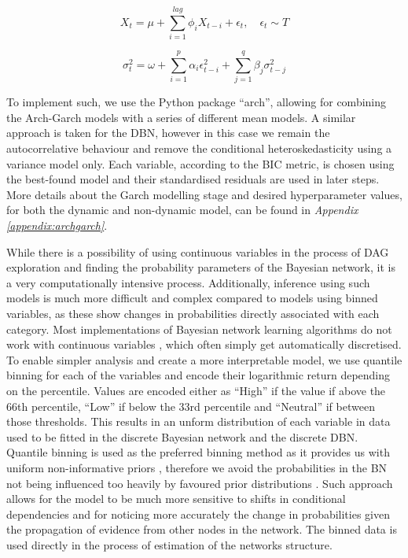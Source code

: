 \documentclass[12pt, letterpaper]{article}
\begin{document}
\begin{equation}
X_t = \mu + \sum_{i=1}^{lag} \phi_i X_{t-i} + \epsilon_t, \quad \epsilon_t \sim T
\end{equation}

\begin{equation}
\sigma_t^2=\omega+\sum_{i=1}^{p}{\alpha_i\epsilon_{t-i}^2}+\sum_{j=1}^{q}{\beta_j\sigma_{t-j}^2}
\end{equation}

To implement such, we use the Python package “arch”, allowing for combining the Arch-Garch models with a series of different mean models. A similar approach is taken for the DBN, however in this case we remain the autocorrelative behaviour and remove the conditional heteroskedasticity using a variance model only. Each variable, according to the BIC metric, is chosen using the best-found model and their standardised residuals are used in later steps. More details about the Garch modelling stage and desired hyperparameter values, for both the dynamic and non-dynamic model, can be found in \textit{Appendix \ref{appendix:archgarch}}.

While there is a possibility of using continuous variables in the process of DAG exploration and finding the probability parameters of the Bayesian network, it is a very computationally intensive process. Additionally, inference using such models is much more difficult and complex compared to models using binned variables, as these show changes in probabilities directly associated with each category. Most implementations of Bayesian network learning algorithms do not work with continuous variables \parencite{beuzen2018, nojavan2017}, which often simply get automatically discretised. To enable simpler analysis and create a more interpretable model, we use quantile binning for each of the variables and encode their logarithmic return depending on the percentile. Values are encoded either as “High” if the value if above the 66th percentile, “Low” if below the 33rd percentile and “Neutral” if between those thresholds. This results in an unform distribution of each variable in data used to be fitted in the discrete Bayesian network and the discrete DBN. Quantile binning is used as the preferred binning method as it provides us with uniform non-informative priors \parencite{nojavan2017}, therefore we avoid the probabilities in the BN not being influenced too heavily by favoured prior distributions \parencite{beuzen2018}. Such approach allows for the model to be much more sensitive to shifts in conditional dependencies and for noticing more accurately the change in probabilities given the propagation of evidence from other nodes in the network. The binned data is used directly in the process of estimation of the networks structure.
\end{document}
